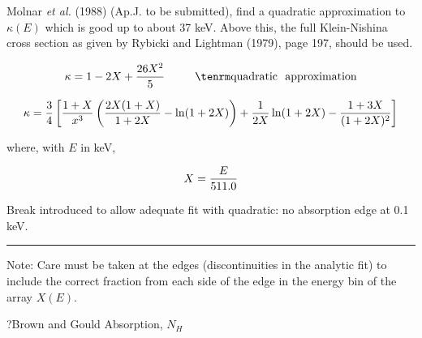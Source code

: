 \itemitem{}Molnar {\it et al.} (1988) (Ap.J. to be submitted), find a quadratic
approximation to $\kappa(E)$ which is good up to about 37 keV.  Above
this,
the full Klein-Nishina cross section as  given by Rybicki and Lightman
(1979),
page 197, should be used.

$$\kappa = 1- 2X + {26 X^2 \over 5} ~~~~~~~~{\rm quadratic~~approximation}$$

$$\kappa = {3 \over 4} \left[ {{1+X} \over x^3} \left( {{2 X (1+X)} \over
{1+ 2X} } - \ln (1 + 2X) \right) + {1 \over {2X}} \ln (1+2X)
- {{1+3X} \over (1+2X)^2} \right]$$

\itemitem{}where, with $E$ in keV,

$$X = {E \over 511.0}$$

\centerline{}
\vskip 18pt 
\centerline{}

{\parindent
\vbox{}}


Break introduced to allow adequate fit with quadratic:  no absorption
edge at 0.1 keV.

\hrule


Note:  Care must be taken at the edges (discontinuities in the analytic fit)
to include the correct fraction from each side of the edge in the energy bin of the
array $X(E).$

\par\vfill\eject

\??Brown and Gould Absorption, $N_H$


